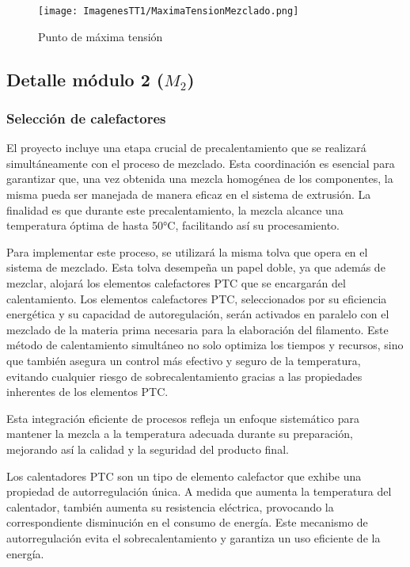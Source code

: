 \documentclass[14pt,oneside]{extarticle} %
\begin{document}
\begin{figure}[H]
    \centering
    \texttt{[image: ImagenesTT1/MaximaTensionMezclado.png]}
    \caption{Punto de máxima tensión}
    \label{fig:MaximaTensionMezclado}
\end{figure}

\subsection{Detalle módulo 2 ($M_2$)}

\subsubsection{Selección de calefactores}

El proyecto incluye una etapa crucial de precalentamiento que se realizará simultáneamente con el proceso de mezclado. Esta coordinación es esencial para garantizar que, una vez obtenida una mezcla homogénea de los componentes, la misma pueda ser manejada de manera eficaz en el sistema de extrusión. La finalidad es que durante este precalentamiento, la mezcla alcance una temperatura óptima de hasta 50°C, facilitando así su procesamiento.

Para implementar este proceso, se utilizará la misma tolva que opera en el sistema de mezclado. Esta tolva desempeña un papel doble, ya que además de mezclar, alojará los elementos calefactores PTC que se encargarán del calentamiento. Los elementos calefactores PTC, seleccionados por su eficiencia energética y su capacidad de autoregulación, serán activados en paralelo con el mezclado de la materia prima necesaria para la elaboración del filamento. Este método de calentamiento simultáneo no solo optimiza los tiempos y recursos, sino que también asegura un control más efectivo y seguro de la temperatura, evitando cualquier riesgo de sobrecalentamiento gracias a las propiedades inherentes de los elementos PTC.

Esta integración eficiente de procesos refleja un enfoque sistemático para mantener la mezcla a la temperatura adecuada durante su preparación, mejorando así la calidad y la seguridad del producto final.

Los calentadores PTC son un tipo de elemento calefactor que exhibe una propiedad de autorregulación única. A medida que aumenta la temperatura del calentador, también aumenta su resistencia eléctrica, provocando la correspondiente disminución en el consumo de energía. Este mecanismo de autorregulación evita el sobrecalentamiento y garantiza un uso eficiente de la energía.
\end{document}
